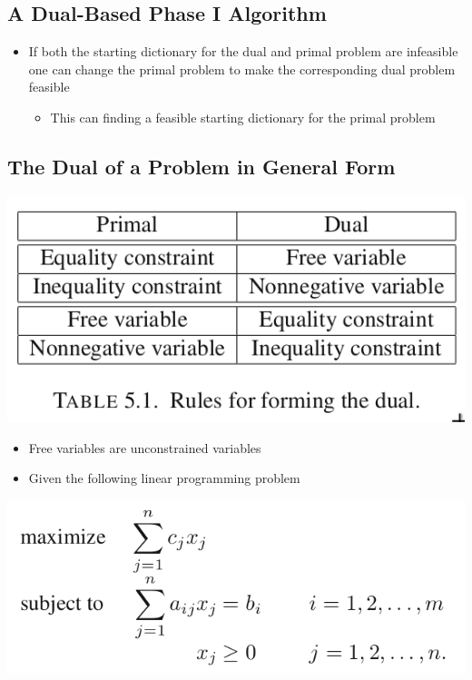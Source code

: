 \documentclass[11pt]{article}
\begin{document}
\subsection{A Dual-Based Phase I Algorithm}
\label{sec:orgd1e38cf}
\begin{itemize}
\item If both the starting dictionary for the dual and primal problem are infeasible one can change the primal problem to make the corresponding dual problem feasible
\begin{itemize}
\item This can finding a feasible starting dictionary for the primal problem
\end{itemize}
\end{itemize}

\subsection{The Dual of a Problem in General Form}
\label{sec:org4fe6723}
\begin{center}
\includegraphics[width=.9\linewidth]{Duality Theory/screenshot_2019-02-06_11-47-39.png}
\end{center}
\begin{itemize}
\item Free variables are unconstrained variables

\item Given the following linear programming problem
\end{itemize}
\begin{center}
\includegraphics[width=.9\linewidth]{Duality Theory/screenshot_2019-02-06_11-49-18.png}
\end{center}
\end{document}
